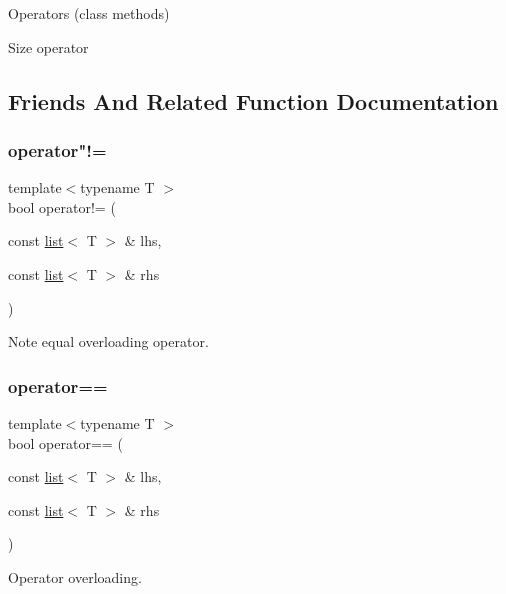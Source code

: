Operators (class methods) 

Size operator 

\subsection{Friends And Related Function Documentation}
\mbox{\label{classsc_1_1list_ae31168758d84aaaad62ef080ccb91bac}} 
\subsubsection{\texorpdfstring{operator"!=}{operator!=}}
{\footnotesize\ttfamily template$<$typename T $>$ \\
bool operator!= (\begin{DoxyParamCaption}\item[{const \hyperlink{classsc_1_1list}{list}$<$ T $>$ \&}]{lhs,  }\item[{const \hyperlink{classsc_1_1list}{list}$<$ T $>$ \&}]{rhs }\end{DoxyParamCaption})\hspace{0.3cm}{\ttfamily [friend]}}



Note equal overloading operator. 

\mbox{\label{classsc_1_1list_a6b11eba79282ca1e3292b3e16bc74062}} 
\subsubsection{\texorpdfstring{operator==}{operator==}}
{\footnotesize\ttfamily template$<$typename T $>$ \\
bool operator== (\begin{DoxyParamCaption}\item[{const \hyperlink{classsc_1_1list}{list}$<$ T $>$ \&}]{lhs,  }\item[{const \hyperlink{classsc_1_1list}{list}$<$ T $>$ \&}]{rhs }\end{DoxyParamCaption})\hspace{0.3cm}{\ttfamily [friend]}}



Operator overloading. 

